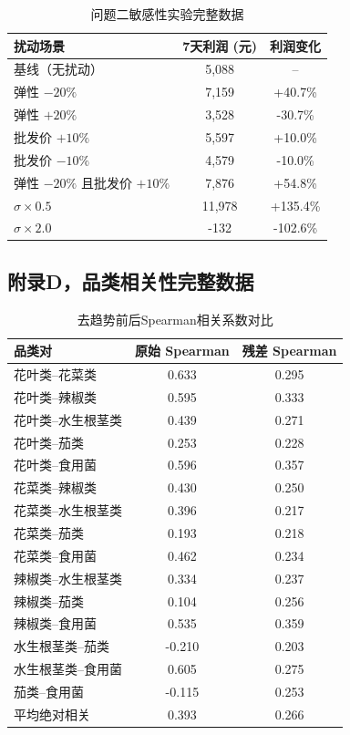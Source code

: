 \begin{table}[H]
\centering
\caption{问题二敏感性实验完整数据}
\begin{tabular}{lcc}
\hline
扰动场景 & 7天利润 (元) & 利润变化 \\
\hline
基线（无扰动） & 5,088 & -- \\
弹性 $-20\%$ & 7,159 & +40.7\% \\
弹性 $+20\%$ & 3,528 & -30.7\% \\
批发价 $+10\%$ & 5,597 & +10.0\% \\
批发价 $-10\%$ & 4,579 & -10.0\% \\
弹性 $-20\%$ 且批发价 $+10\%$ & 7,876 & +54.8\% \\
$\sigma \times 0.5$ & 11,978 & +135.4\% \\
$\sigma \times 2.0$ & -132 & -102.6\% \\
\hline
\end{tabular}
\end{table}

\subsection{附录D，品类相关性完整数据}

\begin{table}[H]
\centering
\caption{去趋势前后Spearman相关系数对比}
\begin{tabular}{lcc}
\hline
品类对 & 原始 Spearman & 残差 Spearman \\
\hline
花叶类--花菜类 & 0.633 & 0.295 \\
花叶类--辣椒类 & 0.595 & 0.333 \\
花叶类--水生根茎类 & 0.439 & 0.271 \\
花叶类--茄类 & 0.253 & 0.228 \\
花叶类--食用菌 & 0.596 & 0.357 \\
花菜类--辣椒类 & 0.430 & 0.250 \\
花菜类--水生根茎类 & 0.396 & 0.217 \\
花菜类--茄类 & 0.193 & 0.218 \\
花菜类--食用菌 & 0.462 & 0.234 \\
辣椒类--水生根茎类 & 0.334 & 0.237 \\
辣椒类--茄类 & 0.104 & 0.256 \\
辣椒类--食用菌 & 0.535 & 0.359 \\
水生根茎类--茄类 & -0.210 & 0.203 \\
水生根茎类--食用菌 & 0.605 & 0.275 \\
茄类--食用菌 & -0.115 & 0.253 \\
\hline
平均绝对相关 & 0.393 & 0.266 \\
\hline
\end{tabular}
\end{table}
